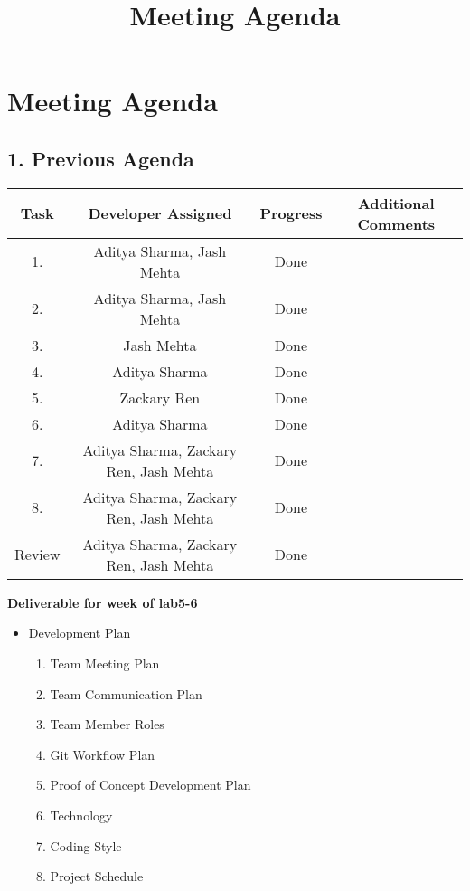 \documentclass[11pt, oneside]{article}   	%
\title{Meeting Agenda}
\author{}
\begin{document}
\setlength{\headsep}{50pt}
\section*{Meeting Agenda}

\subsection*{1. Previous Agenda}
\begin{center}
\begin{tabular}{ | c | c | c | c | }
\hline
Task & Developer Assigned & Progress & Additional Comments\\
\hline
1. & Aditya Sharma, Jash Mehta & Done &\\
\hline
2. & Aditya Sharma, Jash Mehta & Done &\\
\hline
3. & Jash Mehta & Done &\\
\hline
4. & Aditya Sharma & Done &\\
\hline
5. & Zackary Ren & Done &\\
\hline
6. & Aditya Sharma & Done &\\
\hline
7. & Aditya Sharma, Zackary Ren, Jash Mehta & Done &\\
\hline
8. & Aditya Sharma, Zackary Ren, Jash Mehta & Done &\\
\hline
Review & Aditya Sharma, Zackary Ren, Jash Mehta & Done &\\
\hline
\end{tabular}
\end{center}

\textbf{Deliverable for week of lab5-6}
\begin{itemize}
\item Development Plan
\begin{enumerate}
\item Team Meeting Plan
\item Team Communication Plan
\item Team Member Roles
\item Git Workflow Plan
\item Proof of Concept Development Plan
\item Technology
\item Coding Style
\item Project Schedule
\end{enumerate}
\end{itemize}
\newpage{}
\end{document}
